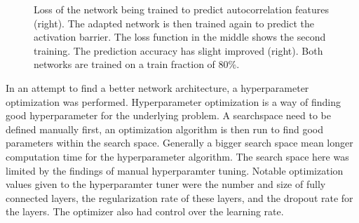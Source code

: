 \begin{figure}[!htb]
    \endminipage
    \caption[LEFD transfer learning]{
    Loss of the network being trained to predict autocorrelation features (right).
    The adapted network is then trained again to predict the activation barrier. The loss function in the middle shows the second training.
    The prediction accuracy has slight improved (right).  
    Both networks are trained on a train fraction of 80\%.
    }
    \label{fig:transfer_final}
\end{figure}

In an attempt to find a better network architecture, a hyperparameter optimization was performed.
Hyperparameter optimization is a way of finding good hyperparameter for the underlying problem.
A searchspace need to be defined manually first, an optimization algorithm is then run to find good parameters within the search space.
Generally a bigger search space mean longer computation time for the hyperparameter algorithm.
The search space here was limited by the findings of manual hyperparamter tuning.
Notable optimization values given to the hyperparamter tuner were the number and size of fully connected layers, the regularization rate of these layers, and the dropout rate for the layers.
The optimizer also had control over the learning rate.


